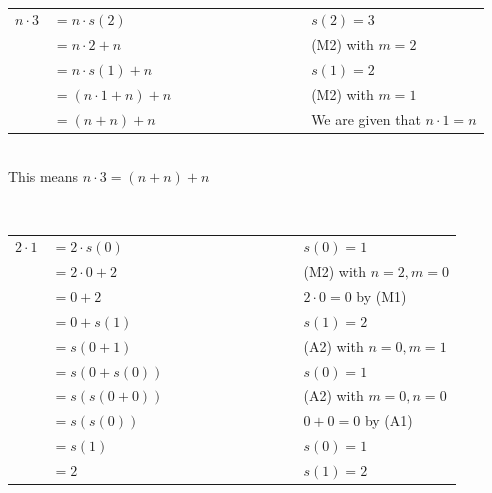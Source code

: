 \documentclass[12pt, a4paper]{exam}
\begin{document}
\begin{questions}
	\pointsdroppedatright
	\question
\vspace{0.2in}
	\pointsdroppedatright
	\question \ \\
	

\begin{tabular}{llll}
$n \cdot 3$ & $= n\cdot s(2)$ & \ \ \ \ \ \ \ \ \ \ \ \ \ \ \ \ & $s(2)=3$ \\
\ & $= n\cdot 2 + n$ & \ \ \ \ \ \ \ \ \ \ \ \ \ \ \ \ & (M2) with $m=2$ \\
\ & $= n\cdot s(1) + n$ & \ \ \ \ \ \ \ \ \ \ \ \ \ \ \ \ & $s(1)=2$ \\
\ & $= (n\cdot 1+n) + n$ & \ \ \ \ \ \ \ \ \ \ \ \ \ \ \ \ & (M2) with $m=1$ \\
\ & $= (n + n) + n$ & \ \ \ \ \ \ \ \ \ \ \ \ \ \ \ \ & We are given that $n\cdot 1 = n$  \\
\end{tabular} \\
This means $n \cdot 3 = (n+n)+n$


		\question \ \\
	\begin{tabular}{llll}
$2 \cdot 1$ & $= 2\cdot s(0)$ & \ \ \ \ \ \ \ \ \ \ \ \ \ \ \ \ & $s(0)=1$ \\
\ & $= 2\cdot 0 + 2$ & \ \ \ \ \ \ \ \ \ \ \ \ \ \ \ \ & (M2) with $n=2, m=0$ \\
\ & $= 0 + 2$ & \ \ \ \ \ \ \ \ \ \ \ \ \ \ \ \ & $2\cdot 0 = 0$ by (M1) \\
\ & $= 0 + s(1)$ & \ \ \ \ \ \ \ \ \ \ \ \ \ \ \ \ & $s(1)=2 $\\
\ & $= s(0+1)$ & \ \ \ \ \ \ \ \ \ \ \ \ \ \ \ \ & (A2) with $n=0, m=1$ \\
\ & $= s(0+s(0))$ & \ \ \ \ \ \ \ \ \ \ \ \ \ \ \ \ & $s(0)=1$ \\
\ & $= s(s(0+0))$ & \ \ \ \ \ \ \ \ \ \ \ \ \ \ \ \ & (A2) with $m=0, n=0$ \\
\ & $= s(s(0))$ & \ \ \ \ \ \ \ \ \ \ \ \ \ \ \ \ & $0+0=0$ by (A1) \\
\ & $= s(1)$ & \ \ \ \ \ \ \ \ \ \ \ \ \ \ \ \ & $s(0)=1$ \\
\ & $= 2$ & \ \ \ \ \ \ \ \ \ \ \ \ \ \ \ \ & $s(1)=2$ \\



\end{tabular}
\end{questions}
\end{document}
